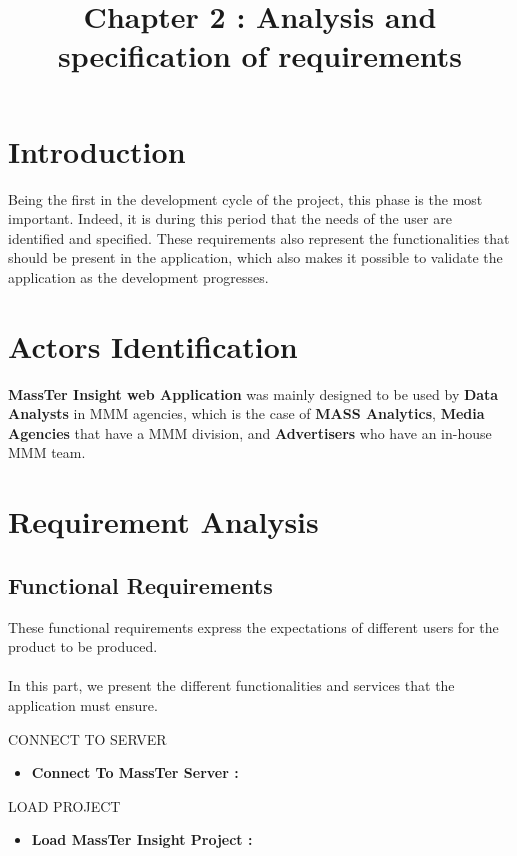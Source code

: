 \documentclass[12pt]{article}
\begin{document}
	\listoffigures
	\title{Chapter 2 : Analysis and specification of requirements}
	\maketitle
	
	\section{Introduction}
	Being the first in the development cycle of the project, this phase is the most
	important. Indeed, it is during this period that the needs of the user are identified and specified. These requirements also represent the functionalities that should be present in the application, which also makes it possible to validate the application as the development progresses.
	\section{Actors Identification}
	\textbf{MassTer Insight web Application }was mainly designed to be used by \textbf{Data Analysts }in MMM agencies, which is the case of \textbf{MASS Analytics}, \textbf{Media Agencies }that have a MMM division, and \textbf{Advertisers }who have an in-house MMM team.
	
	\clearpage
	\newpage
	
	
	\section{Requirement Analysis}
	\subsection{Functional Requirements}
	These functional requirements express the expectations of different users for the product to be produced.
	\\
	\\
	In this part, we present the different functionalities and services that the application must ensure.
	
	CONNECT TO SERVER
	\begin{itemize}
		\setlength{\itemindent}{+.5in}
		\item \textbf{Connect To MassTer Server : } 
	\end{itemize}
	
	LOAD PROJECT
	\begin{itemize}
		\setlength{\itemindent}{+.5in}
     	\item \textbf{Load MassTer Insight Project : } 
    \end{itemize}	
 
\end{document}
